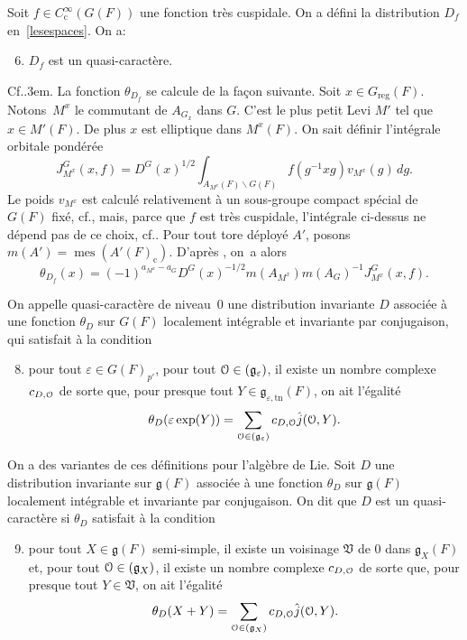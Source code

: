 \documentclass[11pt]{article}
\newcommand{\cf}{cf.\xspace}
\numberwithin{equation}{section}\providecommand{\og}{«\,}\providecommand{\fg}{\,»}
\let\mathcal \EuScript
\newcommand{\NoChangel}[1]{%
\expandafter\let\csname old\string#1\endcsname=#1
\let#1=\relax
\newcommand{#1}{\mathcode`l="716C\csname old\string#1\endcsname\mathcode`l="7160 }%
}
\let\epsilon\varepsilon
\newcommand\Cf{Cf.\kern.3em}
\newcommand{\frg}{\mathfrak{g}}
\newcommand{\frV}{\mathfrak{V}}
\newcommand{\rc}{\mathrm{c}}
\newcommand{\Nil}{\mathrm{Nil}} \NoChangel{\Nil}
\newcommand{\reg}{\mathrm{reg}}
\newcommand{\tn}{\mathrm{tn}}
\DeclareMathOperator{\mes}{mes}
\newcommand{\cO}{\mathcal{O}}
\theoremstyle{plain}
\theoremstyle{definition}
\begin{document}
Soit $f\in C_{\rc}^{\infty}(G(F))$ une fonction très cuspidale. On a défini la distribution $D_{f}$ en~\ref{lesespaces}. On a:
\begin{enumerate}\setcounter{enumi}{5}
\item\label{quasicaracteres6}
$D_{f}$ est un quasi-caractère.
\end{enumerate}
\Cf \cite[5.9]{W1}. La fonction $\theta_{D_{f}}$ se calcule de la façon suivante. Soit $x\in G_{\reg}(F)$. Notons~$M^x$ le commutant de $A_{G_{x}}$ dans $G$. C'est le plus petit Levi $M'$ tel que $x\in M'(F)$. De plus $x$ est elliptique dans $M^{x}(F)$. On sait définir l'intégrale orbitale pondérée
\[
J^G_{M^{x}}(x,f)=D^G(x)^{1/2}\int_{A_{M^{x}}(F)\backslash G(F)}f(g^{-1}xg)v_{M^{x}}(g)\,dg.
\]
Le poids $v_{M^{x}}$ est calculé relativement à un sous-groupe compact spécial de $G(F)$ fixé, \cf \cite{A1}, mais, parce que $f$ est très cuspidale, l'intégrale ci-dessus ne dépend pas de ce choix, \cf \cite[Lem.\,5.2]{W1}. Pour tout tore déployé $A'$, posons $m(A')=\mes(A'(F)_{\rc})$. D'après \cite[9(1)]{W2}, on~a alors
\begin{equation}\tag{7}\label{quasicaracteres7}
\theta_{D_{f}}(x)=(-1)^{a_{M^{x}}-a_{G}}D^G(x)^{-1/2}m(A_{M^{x}})m(A_{G})^{-1}J^G_{M^{x}}(x,f).
\end{equation}

On appelle quasi-caractère de niveau~$0$ une distribution invariante $D$ associée à une fonction $\theta_{D}$ sur $G(F)$ localement intégrable et invariante par conjugaison, qui satisfait à la condition
\begin{enumerate}\setcounter{enumi}{7}
\item\label{quasicaracteres8}
pour tout $\epsilon\in G(F)_{p'}$, pour tout $\cO\in \Nil(\frg_{\epsilon})$, il existe un nombre complexe $c_{D,\cO}$ de sorte que, pour presque tout $Y\in \frg_{\epsilon,\tn}(F)$, on ait l'égalité
\[
\theta_{D}(\epsilon \exp(Y))=\sum_{\cO\in \Nil(\frg_{\epsilon})}c_{D,\cO}\hat{j}(\cO,Y).
\]
\end{enumerate}

On a des variantes de ces définitions pour l'algèbre de Lie. Soit $D$ une distribution invariante sur $\frg(F)$ associée à une fonction $\theta_{D}$ sur $\frg(F)$ localement intégrable et invariante par conjugaison. On dit que $D$ est un quasi-caractère si $\theta_{D}$ satisfait à la condition
\begin{enumerate}\setcounter{enumi}{8}
\item\label{quasicaracteres9}
pour tout $X\in \frg(F)$ semi-simple, il existe un voisinage $\frV$ de $0$ dans $\frg_{X}(F)$ et, pour tout $\cO\in \Nil(\frg_{X})$, il existe un nombre complexe $c_{D,\cO}$ de sorte que, pour presque tout $Y\in \frV$, on ait l'égalité
\[
\theta_{D}(X+Y)=\sum_{\cO\in \Nil(\frg_{X})}c_{D,\cO}\hat{j}(\cO,Y).
\]
\end{enumerate}
\end{document}
